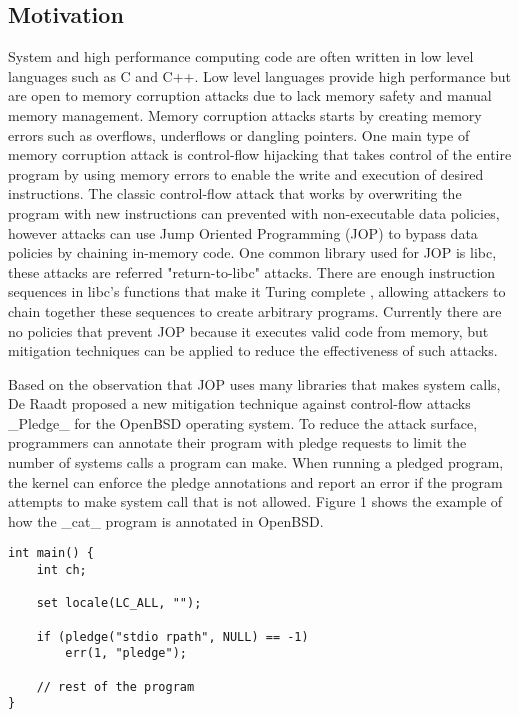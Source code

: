 \subsection{Motivation}

System and high performance computing code are often written in low level languages such as C and C++. Low level languages provide high performance but are open to memory corruption attacks due to lack memory safety and manual memory management. Memory corruption attacks \cite{Szekeres_2013} starts by creating memory errors such as overflows, underflows or dangling pointers. One main type of memory corruption attack is control-flow hijacking that takes control of the entire program by using memory errors to enable the write and execution of desired instructions. The classic control-flow attack that works by overwriting the program with new instructions can prevented with non-executable data policies, however attacks can use Jump Oriented Programming (JOP) to bypass data policies by chaining in-memory code. One common library used for JOP is libc, these attacks are referred "return-to-libc" attacks. There are enough instruction sequences in libc's functions that make it Turing complete \cite{Tran_2011}, allowing attackers to chain together these sequences to create arbitrary programs. Currently there are no policies that prevent JOP because it executes valid code from memory, but mitigation techniques \cite{Li_2010}\cite{Pappas_2012}\cite{pledge} can be applied to reduce the effectiveness of such attacks.

Based on the observation that JOP uses many libraries that makes system calls, De Raadt proposed a new mitigation technique against control-flow attacks _Pledge_\cite{pledge} for the OpenBSD operating system. To reduce the attack surface, programmers can annotate their program with pledge\cite{pledge(2)} requests to limit the number of systems calls a program can make. When running a pledged program, the kernel can enforce the pledge annotations and report an error if the program attempts to make system call that is not allowed. Figure 1 shows the example of how the _cat_ program is annotated in OpenBSD.

\begin{lstlisting}
int main() {
    int ch;
    
    set locale(LC_ALL, "");
    
    if (pledge("stdio rpath", NULL) == -1)
        err(1, "pledge");
        
    // rest of the program
}
\end{lstlisting}